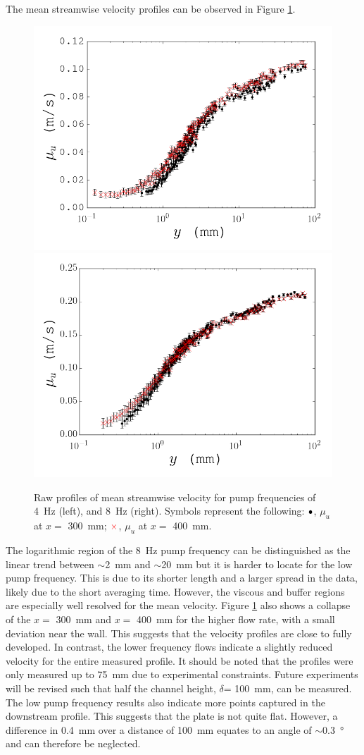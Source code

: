 \documentclass[12pt,oneside,a4paper]{article}
\begin{document}
The mean streamwise velocity profiles can be observed in Figure \ref{figure:experiments:profiles:meanU}.
%
\begin{figure}[!t]
\centering
\includegraphics[width=0.5\linewidth]{images/LDA_profileImages/meanU_4hz.png}\hfill
\includegraphics[width=0.5\linewidth]{images/LDA_profileImages/meanU_8hz.png}
\caption{Raw profiles of mean streamwise velocity for pump frequencies of \SI{4}{Hz} (left), and \SI{8}{Hz} (right). Symbols represent the following: $\color{black}{\bullet}$, $\mu_u$ at $x=$ \SI{300}{mm}; $\color{red}{\times}$, $\mu_u$ at $x=$ \SI{400}{mm}.}
\label{figure:experiments:profiles:meanU}
\end{figure}
%
 The logarithmic region of the \SI{8}{Hz} pump frequency can be distinguished as the linear trend between $\sim$\SI{2}{mm} and $\sim$\SI{20}{mm} but it is harder to locate for the low pump frequency. This is due to its shorter length and a larger spread in the data, likely due to the short averaging time. However, the viscous and buffer regions are especially well resolved for the mean velocity. Figure \ref{figure:experiments:profiles:meanU} also shows a collapse of the $x=$ \SI{300}{mm} and $x=$ \SI{400}{mm} for the higher flow rate, with a small deviation near the wall. This suggests that the velocity profiles are close to fully developed. In contrast, the lower frequency flows indicate a slightly reduced velocity for the entire measured profile. It should be noted that the profiles were only measured up to \SI{75}{mm} due to experimental constraints. Future experiments will be revised such that half the channel height, $\delta$= \SI{100}{mm}, can be measured. The low pump frequency results also indicate more points captured in the downstream profile. This suggests that the plate is not quite flat. However, a difference in \SI{0.4}{mm} over a distance of \SI{100}{mm} equates to an angle of $\sim$\SI{0.3}{\degree} and can therefore be neglected. 
 
\end{document}
